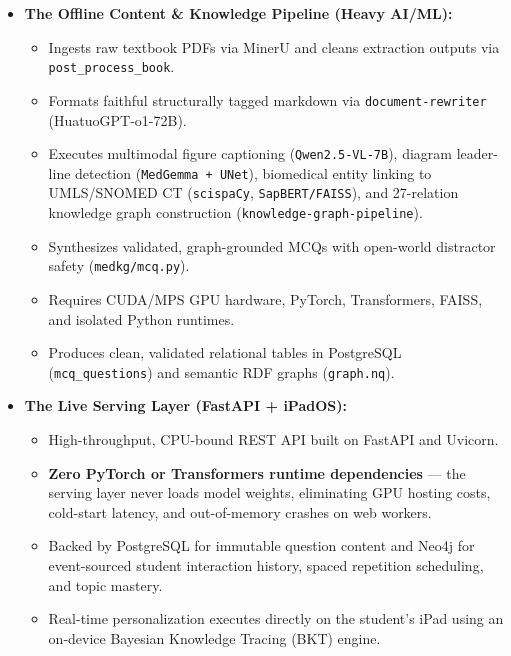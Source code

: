 \begin{itemize}
    \item \textbf{The Offline Content \& Knowledge Pipeline (Heavy AI/ML):}
    \begin{sloppypar}
    \begin{itemize}
        \item Ingests raw textbook PDFs via MinerU and cleans extraction outputs via \texttt{post\_process\_book}.
        \item Formats faithful structurally tagged markdown via \texttt{document-rewriter} (HuatuoGPT-o1-72B).
        \item Executes multimodal figure captioning (\texttt{Qwen2.5-VL-7B}), diagram leader-line detection (\texttt{MedGemma + UNet}), biomedical entity linking to UMLS/SNOMED CT (\texttt{scispaCy}, \texttt{SapBERT/FAISS}), and 27-relation knowledge graph construction (\texttt{knowledge-graph-pipeline}).
        \item Synthesizes validated, graph-grounded MCQs with open-world distractor safety (\texttt{medkg/mcq.py}).
        \item Requires CUDA/MPS GPU hardware, PyTorch, Transformers, FAISS, and isolated Python runtimes.
        \item Produces clean, validated relational tables in PostgreSQL (\texttt{mcq\_questions}) and semantic RDF graphs (\texttt{graph.nq}).
    \end{itemize}
    \end{sloppypar}

    \item \textbf{The Live Serving Layer (FastAPI + iPadOS):}
    \begin{itemize}
        \item High-throughput, CPU-bound REST API built on FastAPI and Uvicorn.
        \item \textbf{Zero PyTorch or Transformers runtime dependencies} --- the serving layer
              never loads model weights, eliminating GPU hosting costs, cold-start latency, and
              out-of-memory crashes on web workers.
        \item Backed by PostgreSQL for immutable question content and Neo4j for event-sourced
              student interaction history, spaced repetition scheduling, and topic mastery.
        \item Real-time personalization executes directly on the student's iPad using an
              on-device Bayesian Knowledge Tracing (BKT) engine.
    \end{itemize}
\end{itemize}

